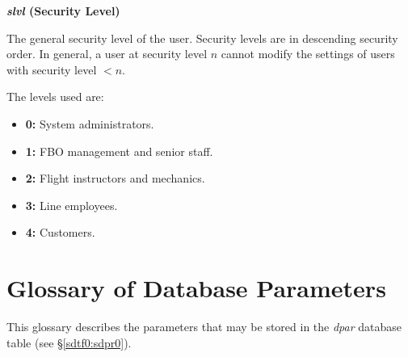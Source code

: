 \documentclass[letterpaper,10pt,titlepage]{article}
\newenvironment{docdbtblfielddef}{\begin{list}
               {}{\setlength{\labelwidth}{0mm}
                  \setlength{\leftmargin}{10mm}
                  \setlength{\itemindent}{-5mm}
                  \setlength{\parsep}{0.85mm}}}
               {\end{list}}
\begin{document}
\begin{docdbtblfielddef}

\item {}\textbf{\emph{slvl} (Security Level)}

      The general security level of the user.  Security levels are in descending
      security order.  In general, a user at security level $n$ 
      cannot modify the settings of users with security level $<n$.

      The levels used are:

      \begin{itemize}
      \item \textbf{0:}
            System administrators.
      \item \textbf{1:}
            FBO management and senior staff.
      \item \textbf{2:}
            Flight instructors and mechanics.
      \item \textbf{3:}
            Line employees.
      \item \textbf{4:}
            Customers.
      \end{itemize}

\end{docdbtblfielddef}


\clearpage{}
\section{Glossary of Database Parameters}
\label{sgld0}

This glossary describes the parameters that may be stored in the 
\emph{dpar} database table (see \S{}\ref{sdtf0:sdpr0}).
\end{document}
